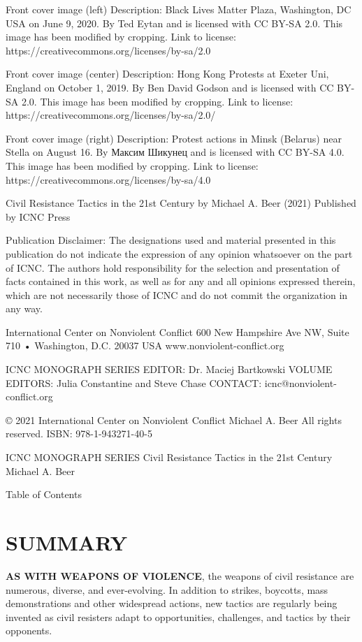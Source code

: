 \documentclass[twoside,a4paper,12pt,fleqn,openany]{extbook}
\begin{document}


Front cover image (left)
Description: Black Lives Matter Plaza, Washington, DC USA on June 9, 2020.
By Ted Eytan and is licensed with CC BY-SA 2.0.
This image has been modified by cropping.
Link to license: https://creativecommons.org/licenses/by-sa/2.0

Front cover image (center)
Description: Hong Kong Protests at Exeter Uni, England on October 1, 2019.
By Ben David Godson and is licensed with CC BY-SA 2.0.
This image has been modified by cropping.
Link to license: https://creativecommons.org/licenses/by-sa/2.0/

Front cover image (right)
Description: Protest actions in Minsk (Belarus) near Stella on August 16.
By Максим Шикунец and is licensed with CC BY-SA 4.0.
This image has been modified by cropping.
Link to license: https://creativecommons.org/licenses/by-sa/4.0

Civil Resistance Tactics in the 21st Century
by Michael A. Beer (2021)
Published by ICNC Press

Publication Disclaimer: The designations used and material presented in this publication
do not indicate the expression of any opinion whatsoever on the part of ICNC.
The authors hold responsibility for the selection and presentation of facts contained in
this work, as well as for any and all opinions expressed therein, which are not necessarily
those of ICNC and do not commit the organization in any way.

International Center on Nonviolent Conflict
600 New Hampshire Ave NW, Suite 710 • Washington, D.C. 20037 USA
www.nonviolent-conflict.org

ICNC MONOGRAPH SERIES EDITOR: Dr. Maciej Bartkowski
VOLUME EDITORS: Julia Constantine and Steve Chase
CONTACT: icnc@nonviolent-conflict.org

© 2021 International Center on Nonviolent Conflict
Michael A. Beer
All rights reserved.
ISBN: 978-1-943271-40-5

ICNC MONOGRAPH SERIES
Civil Resistance Tactics in the 21st Century
Michael A. Beer

Table of Contents

\chapter*{SUMMARY}

\textbf{AS WITH WEAPONS OF VIOLENCE}, the weapons of civil resistance are numerous, diverse, and ever-evolving.
In addition to strikes, boycotts, mass demonstrations and other widespread
actions, new tactics are regularly being invented as civil resisters adapt to opportunities, challenges, and tactics by their opponents.
\end{document}
